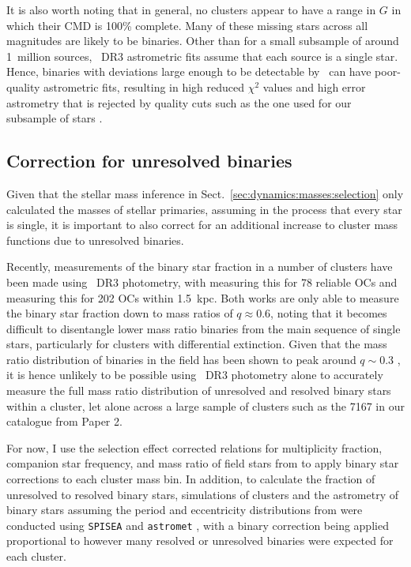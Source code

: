 It is also worth noting that in general, no clusters appear to have a range in $G$ in which their CMD is 100\% complete. Many of these missing stars across all magnitudes are likely to be binaries. Other than for a small subsample of around 1~million sources, \gaia\ DR3 astrometric fits assume that each source is a single star. Hence, binaries with deviations large enough to be detectable by \gaia\ can have poor-quality astrometric fits, resulting in high reduced $\chi^2$ values and high error astrometry that is rejected by quality cuts such as the one used for our subsample of stars \citep[][; see also Sect.~\ref{sec:intro:history:gaia:background}]{lindegren_gaia_2021}.



\subsection{Correction for unresolved binaries}
\label{sec:dynamics:masses:binaries}

Given that the stellar mass inference in Sect.~\ref{sec:dynamics:masses:selection} only calculated the masses of stellar primaries, assuming in the process that every star is single, it is important to also correct for an additional increase to cluster mass functions due to unresolved binaries.

Recently, measurements of the binary star fraction in a number of clusters have been made using \gaia\ DR3 photometry, with \cite{cordoni_photometric_binaries_2023} measuring this for 78 reliable OCs and \cite{donada_multiplicity_fraction_2023} measuring this for 202 OCs within 1.5~kpc. Both works are only able to measure the binary star fraction down to mass ratios of $q\approx0.6$, noting that it becomes difficult to disentangle lower mass ratio binaries from the main sequence of single stars, particularly for clusters with differential extinction. Given that the mass ratio distribution of binaries in the field has been shown to peak around $q\sim0.3$ \citep{moe_mind_2017}, it is hence unlikely to be possible using \gaia\ DR3 photometry alone to accurately measure the full mass ratio distribution of unresolved and resolved binary stars within a cluster, let alone across a large sample of clusters such as the 7167 in our catalogue from Paper 2.

For now, I use the selection effect corrected relations for multiplicity fraction, companion star frequency, and mass ratio of field stars from \cite{moe_mind_2017} to apply binary star corrections to each cluster mass bin. In addition, to calculate the fraction of unresolved to resolved binary stars, simulations of clusters and the astrometry of binary stars assuming the period and eccentricity distributions from \cite{moe_mind_2017} were conducted using \texttt{SPISEA} \citep{hosek_jr_pypopstar_2020} and \texttt{astromet} \citep{penoyre_astrometric_2022,penoyre_astrometric_2022-1}, with a binary correction being applied proportional to however many resolved or unresolved binaries were expected for each cluster.

